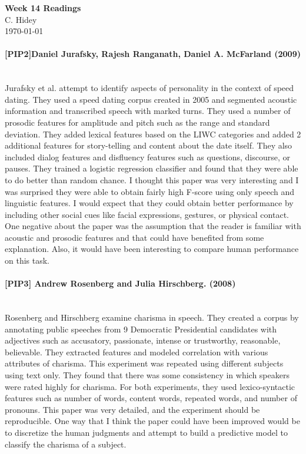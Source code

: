\documentclass[12pt]{article}
\begin{document}
\begin{center}
  \textbf{Week 14 Readings} \\
  C. Hidey \\
  \today
\end{center}


\paragraph{{\bf [PIP2]Daniel Jurafsky, Rajesh Ranganath, Daniel A. McFarland (2009) }}
\text{} \\
Jurafsky et al. attempt to identify aspects of personality
in the context of speed dating.  They used a speed dating corpus created in 2005 and
segmented acoustic information and transcribed speech with marked turns.  They used a 
number of prosodic features for amplitude and pitch such as the range and standard
deviation.  They added lexical features based on the LIWC categories and added 2 
additional features for story-telling and content about the date itself.  They also
included dialog features and disfluency features such as questions, discourse, or pauses.
They trained a logistic regression classifier and found that they were able to do 
better than random chance.
I thought this paper was very interesting and I was surprised they were able to obtain
fairly high F-score using only speech and linguistic features.  I would expect that
they could obtain better performance by including other social cues like facial 
expressions, gestures, or physical contact.
One negative about the paper was the assumption that the reader is familiar with acoustic
and prosodic features and that could have benefited from some explanation.
Also, it would have been interesting to compare human performance on this task.

\paragraph{{\bf [PIP3] Andrew Rosenberg and Julia Hirschberg. (2008)}}
\text{} \\
Rosenberg and Hirschberg examine charisma in speech.  They created a corpus by annotating
public speeches from 9 Democratic Presidential candidates with adjectives such as accusatory,
passionate, intense or trustworthy, reasonable, believable.  They extracted features and
modeled correlation with various attributes of charisma.  This experiment was repeated
using different subjects using text only.  
They found that there was some consistency in which speakers were rated highly for charisma.
For both experiments, they used lexico-syntactic features such as number of words, content words,
repeated words, and number of pronouns.  
This paper was very detailed, and the experiment should be reproducible.  One way that I think the
paper could have been improved would be to discretize the human judgments and attempt to build
a predictive model to classify the charisma of a subject.
\end{document}

